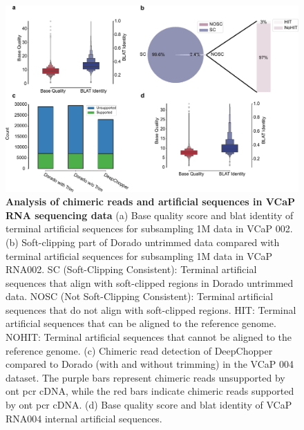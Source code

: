 \documentclass[pdflatex, sn-mathphys-num, lineno]{sn-jnl}%
\theoremstyle{thmstyleone}%
\theoremstyle{thmstyletwo}%
\theoremstyle{thmstylethree}%
\begin{document}
\begin{figure}[!h]
	\includegraphics[height=0.65\columnwidth]{finals/sf1}
	\caption{ {\bf Analysis of chimeric reads and artificial sequences in VCaP RNA sequencing data } (a) Base quality score and \gls{blat} identity of terminal artificial sequences for subsampling 1M data in VCaP 002. (b) Soft-clipping part of Dorado untrimmed data compared with terminal artificial sequences for subsampling 1M data in VCaP RNA002. SC (Soft-Clipping Consistent): Terminal artificial sequences that align with soft-clipped regions in Dorado untrimmed data. NOSC (Not Soft-Clipping Consistent): Terminal artificial sequences that do not align with soft-clipped regions. HIT: Terminal artificial sequences that can be aligned to the reference genome. NOHIT: Terminal artificial sequences that cannot be aligned to the reference genome. (c) Chimeric read detection of DeepChopper compared to Dorado (with and without trimming) in the VCaP 004 dataset. The purple bars represent chimeric reads unsupported by \gls{ont} \gls{pcr} cDNA, while the red bars indicate chimeric reads supported by \gls{ont} \gls{pcr} cDNA.  (d) Base quality score and \gls{blat} identity of VCaP RNA004 internal artificial sequences.}
	\label{fig:sf1}
\end{figure}
\end{document}
